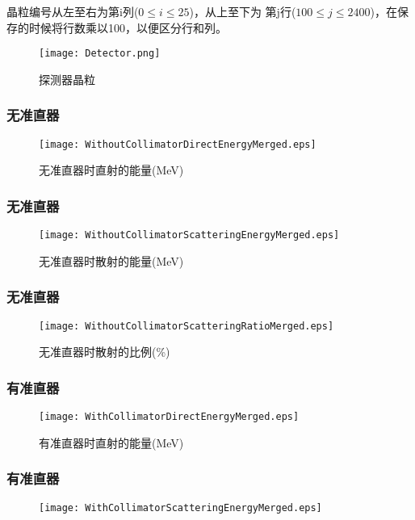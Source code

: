\documentclass{beamer}
\begin{document}
\begin{CJK*}{UTF8}{gkai}
\begin{frame}
\begin{minipage}[t]{0.3\textwidth}
      晶粒编号从左至右为第i列($0\leq i \leq 25$)，从上至下为
      第j行($100\le j \le2400$)，在保存的时候将行数乘以100，以便区分行和列。
    \end{minipage}
    \begin{minipage}[t]{0.7\textwidth}
      \begin{figure}[ht]
	\centering
        \texttt{[image: Detector.png]}
	\caption{\liuhao 探测器晶粒}
	\label{Detector}
      \end{figure}
    \end{minipage}
  \end{frame}
  \begin{frame}\frametitle{无准直器}
    \begin{figure}[ht]
      \centering
      \texttt{[image: WithoutCollimatorDirectEnergyMerged.eps]}
      \caption{\liuhao 无准直器时直射的能量(MeV)}
    \end{figure}
  \end{frame}
  \begin{frame}\frametitle{无准直器}
    \begin{figure}[ht]
      \centering
      \texttt{[image: WithoutCollimatorScatteringEnergyMerged.eps]}
      \caption{\liuhao 无准直器时散射的能量(MeV)}
    \end{figure}
  \end{frame}
  \begin{frame}\frametitle{无准直器}
    \begin{figure}[ht]
      \centering
      \texttt{[image: WithoutCollimatorScatteringRatioMerged.eps]}
      \caption{\liuhao 无准直器时散射的比例(\%)}
    \end{figure}
  \end{frame}
  \begin{frame}\frametitle{有准直器}
    \begin{figure}[ht]
      \centering
      \texttt{[image: WithCollimatorDirectEnergyMerged.eps]}
      \caption{\liuhao 有准直器时直射的能量(MeV)}
    \end{figure}
  \end{frame}
  \begin{frame}\frametitle{有准直器}
    \begin{figure}[ht]
      \centering
      \texttt{[image: WithCollimatorScatteringEnergyMerged.eps]}

\end{figure}
\end{frame}
\end{CJK*}
\end{document}
